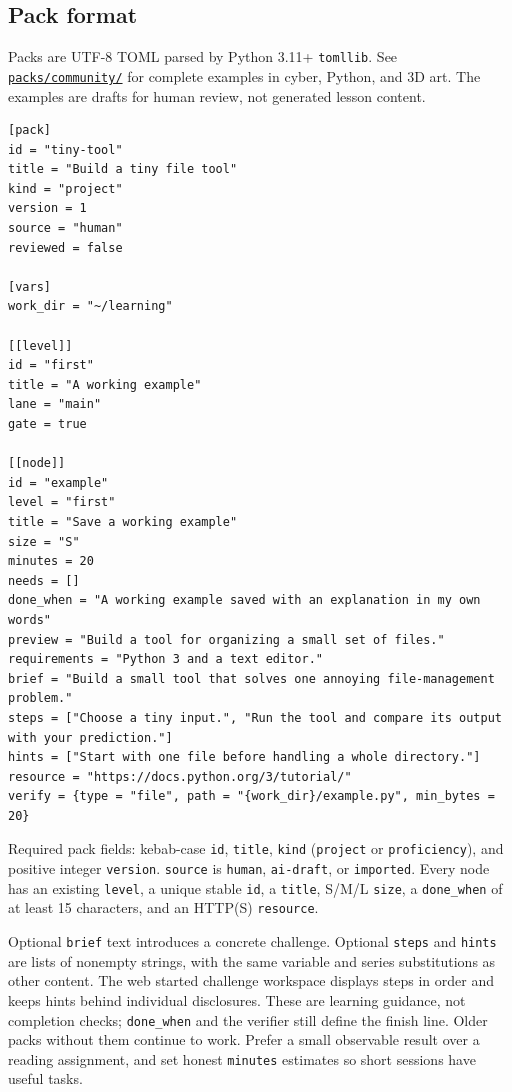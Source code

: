 \hypertarget{pack-format}{%
\subsection{Pack format}\label{pack-format}}

Packs are UTF-8 TOML parsed by Python 3.11+ \texttt{tomllib}. See
\href{../packs/community/}{\texttt{packs/community/}} for complete
examples in cyber, Python, and 3D art. The examples are drafts for human
review, not generated lesson content.

\begin{verbatim}
[pack]
id = "tiny-tool"
title = "Build a tiny file tool"
kind = "project"
version = 1
source = "human"
reviewed = false

[vars]
work_dir = "~/learning"

[[level]]
id = "first"
title = "A working example"
lane = "main"
gate = true

[[node]]
id = "example"
level = "first"
title = "Save a working example"
size = "S"
minutes = 20
needs = []
done_when = "A working example saved with an explanation in my own words"
preview = "Build a tool for organizing a small set of files."
requirements = "Python 3 and a text editor."
brief = "Build a small tool that solves one annoying file-management problem."
steps = ["Choose a tiny input.", "Run the tool and compare its output with your prediction."]
hints = ["Start with one file before handling a whole directory."]
resource = "https://docs.python.org/3/tutorial/"
verify = {type = "file", path = "{work_dir}/example.py", min_bytes = 20}
\end{verbatim}

Required pack fields: kebab-case \texttt{id}, \texttt{title},
\texttt{kind} (\texttt{project} or \texttt{proficiency}), and positive
integer \texttt{version}. \texttt{source} is \texttt{human},
\texttt{ai-draft}, or \texttt{imported}. Every node has an existing
\texttt{level}, a unique stable \texttt{id}, a \texttt{title}, S/M/L
\texttt{size}, a \texttt{done\_when} of at least 15 characters, and an
HTTP(S) \texttt{resource}.

Optional \texttt{brief} text introduces a concrete challenge. Optional
\texttt{steps} and \texttt{hints} are lists of nonempty strings, with
the same variable and series substitutions as other content. The web
started challenge workspace displays steps in order and keeps hints behind
individual disclosures. These are learning guidance, not completion
checks; \texttt{done\_when} and the verifier still define the finish
line. Older packs without them continue to work. Prefer a small
observable result over a reading assignment, and set honest
\texttt{minutes} estimates so short sessions have useful tasks.

